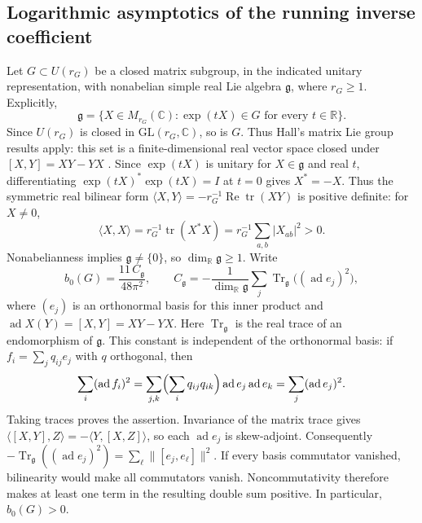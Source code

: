 \subsection{Logarithmic asymptotics of the running inverse coefficient}
\label{sec:running-coefficient}

Let \(G\subset U(r_G)\) be a closed matrix subgroup, in the indicated
unitary representation, with nonabelian simple real Lie algebra
\(\mathfrak g\), where \(r_G\ge1\). Explicitly,
\[
 \mathfrak g=\{X\in M_{r_G}(\mathbb C):
       \exp(tX)\in G\text{ for every }t\in\mathbb R\}.
\]
Since \(U(r_G)\) is closed in \(\mathrm{GL}(r_G,\mathbb C)\), so is \(G\).
Thus Hall's matrix Lie group results apply: this set is a finite-dimensional
real vector space closed under \([X,Y]=XY-YX\)
\cite[Definition~3.13 and Theorem~3.16]{hall2000}.
Since \(\exp(tX)\) is unitary for
\(X\in\mathfrak g\) and real \(t\), differentiating
\(\exp(tX)^*\exp(tX)=I\) at \(t=0\) gives \(X^*=-X\).
Thus the symmetric real bilinear form
\(\langle X,Y\rangle=-r_G^{-1}\operatorname{Re}\operatorname{tr}(XY)\)
is positive definite: for \(X\ne0\),
\[
 \langle X,X\rangle
 =r_G^{-1}\operatorname{tr}(X^*X)
 =r_G^{-1}\sum_{a,b}|X_{ab}|^2>0.
\]
Nonabelianness implies \(\mathfrak g\ne\{0\}\), so
\(\dim_{\mathbb R}\mathfrak g\ge1\). Write
\[
    b_0(G)=\frac{11\,C_{\mathfrak g}}{48\pi^2},
    \qquad
    C_{\mathfrak g}
      =-\frac{1}{\dim_{\mathbb R}\mathfrak g}
        \sum_j \operatorname{Tr}_{\mathfrak g}
             \bigl((\operatorname{ad}e_j)^2\bigr),
\]
where \((e_j)\) is an orthonormal basis for this inner product and
\(\operatorname{ad}X(Y)=[X,Y]=XY-YX\). Here
\(\operatorname{Tr}_{\mathfrak g}\) is the real trace of an endomorphism of
\(\mathfrak g\). This constant is independent of the orthonormal basis:
if \(f_i=\sum_j q_{ij}e_j\) with \(q\) orthogonal, then
\[
 \sum_i(\operatorname{ad}f_i)^2
 =\sum_{j,k}\Bigl(\sum_iq_{ij}q_{ik}\Bigr)
       \operatorname{ad}e_j\operatorname{ad}e_k
 =\sum_j(\operatorname{ad}e_j)^2.
\]
Taking traces proves the assertion. Invariance of the matrix trace gives
\(\langle[X,Y],Z\rangle=-\langle Y,[X,Z]\rangle\), so each
\(\operatorname{ad}e_j\) is skew-adjoint. Consequently
\(-\operatorname{Tr}_{\mathfrak g}((\operatorname{ad}e_j)^2)
=\sum_\ell\|[e_j,e_\ell]\|^2\). If every basis commutator vanished,
bilinearity would make all commutators vanish. Noncommutativity therefore
makes at least one term in the resulting double sum positive. In particular,
\(b_0(G)>0\).

